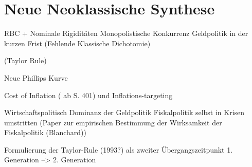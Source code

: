 %
%
%

\chapter{Neue Neoklassische Synthese}
\label{Neue Neoklassische Synthese}

RBC + \textcite{RomerDavid1990}
Nominale Rigiditäten
Monopolistische Konkurrenz
Geldpolitik in der kurzen Frist (Fehlende Klassische Dichotomie)

(Taylor Rule)

Neue Phillips Kurve

Cost of Inflation (\textcite{Snowdon2005} ab S. 401) und Inflations-targeting

Wirtschaftspolitisch Dominanz der Geldpolitik
Fiskalpolitik selbst in Krisen umstritten (Paper zur empirischen Bestimmung der Wirksamkeit der Fiskalpolitik (Blanchard))

Formulierung der Taylor-Rule (1993?) als zweiter Übergangszeitpunkt 1. Generation --> 2. Generation

